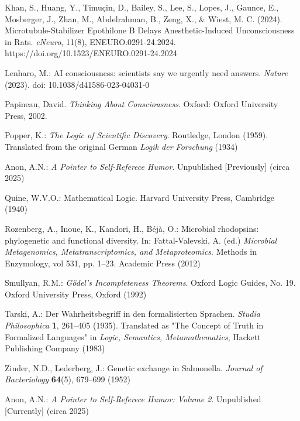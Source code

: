 \documentclass[runningheads]{llncs}
\begin{document}
\begin{thebibliography}{99}
 Khan, S., Huang, Y., Timuçin, D., Bailey, S., Lee, S., Lopes, J., Gaunce, E., Mosberger, J., Zhan, M., Abdelrahman, B., Zeng, X., \& Wiest, M. C. (2024). Microtubule-Stabilizer Epothilone B Delays Anesthetic-Induced Unconsciousness in Rats. \emph{eNeuro}, 11(8), ENEURO.0291-24.2024. https://doi.org/10.1523/ENEURO.0291-24.2024

 Lenharo, M.: AI consciousness: scientists say we urgently need answers. \emph{Nature} (2023). doi: 10.1038/d41586-023-04031-0

\cite{Papineau2002} Papineau, David. \emph{Thinking About Consciousness}. Oxford: Oxford University Press, 2002.

 Popper, K.: \emph{The Logic of Scientific Discovery}. Routledge, London (1959). Translated from the original German \emph{Logik der Forschung} (1934)

 Anon, A.N.: \emph{A Pointer to Self-Referece Humor}. Unpublished [Previously] (circa 2025)

 Quine, W.V.O.: Mathematical Logic. Harvard University Press, Cambridge (1940)

 Rozenberg, A., Inoue, K., Kandori, H., Béjà, O.: Microbial rhodopsins: phylogenetic and functional diversity. In: Fattal-Valevski, A. (ed.) \emph{Microbial Metagenomics, Metatranscriptomics, and Metaproteomics}. Methods in Enzymology, vol 531, pp. 1--23. Academic Press (2012)

 Smullyan, R.M.: \emph{Gödel's Incompleteness Theorems}. Oxford Logic Guides, No. 19. Oxford University Press, Oxford (1992)

 Tarski, A.: Der Wahrheitsbegriff in den formalisierten Sprachen. \emph{Studia Philosophica} \textbf{1}, 261--405 (1935). Translated as "The Concept of Truth in Formalized Languages" in \emph{Logic, Semantics, Metamathematics}, Hackett Publishing Company (1983)

 Zinder, N.D., Lederberg, J.: Genetic exchange in Salmonella. \emph{Journal of Bacteriology} \textbf{64}(5), 679--699 (1952)

 Anon, A.N.: \emph{A Pointer to Self-Referece Humor: Volume 2}. Unpublished [Currently] (circa 2025)

\end{thebibliography}
\end{document}
